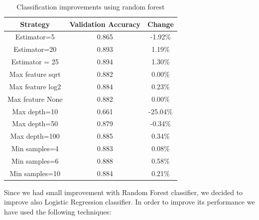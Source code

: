 \documentclass[12pt]{article}
\begin{document}
\begin{table}[H]
	\centering
	\begin{tabular}{|c|c|c|}
		\hline
		\textbf{Strategy} & \textbf{Validation Accuracy} & \textbf{Change} \\ \hline
		Estimator=5       & 0.865                        & -1.92\%         \\ \hline
		Estimator=20      & 0.893                        & 1.19\%          \\ \hline
		Estimator = 25    & 0.894                        & 1.30\%          \\ \hline
		Max feature sqrt  & 0.882                        & 0.00\%          \\ \hline
		Max feature log2  & 0.884                        & 0.23\%          \\ \hline
		Max feature None  & 0.882                        & 0.00\%          \\ \hline
		Max depth=10      & 0.661                        & -25.04\%        \\ \hline
		Max depth=50      & 0.879                        & -0.34\%         \\ \hline
		Max depth=100     & 0.885                        & 0.34\%          \\ \hline
		Min samples=4     & 0.883                        & 0.08\%          \\ \hline
		Min samples=6     & 0.888                        & 0.58\%          \\ \hline
		Min samples=10    & 0.884                        & 0.21\%          \\ \hline
	\end{tabular}
	\label{impr1}
	\caption{Classification improvements using random forest}
\end{table}

Since we had small improvement with Random Forest classifier, we decided to improve also Logistic Regression classifier. In order to improve its performance we have used the following techniques:
\end{document}
